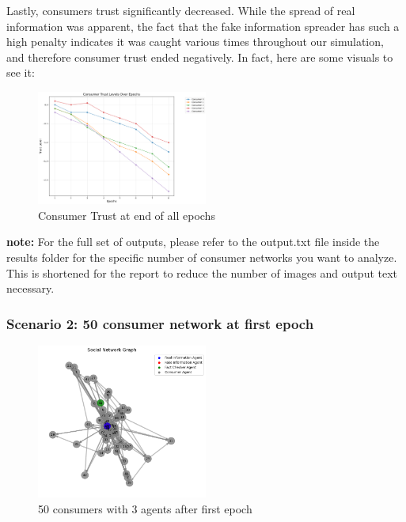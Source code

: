 \documentclass[twoside]{article}
\begin{document}
 Lastly, consumers trust significantly decreased. While the spread of real information was apparent, the fact that the fake information spreader has such a high penalty indicates it was caught various times throughout our simulation, and therefore consumer trust ended negatively. In fact,  here are some visuals to see it:

\begin{figure}[htbp]
     \centering
     \includegraphics[width=0.5\textwidth]{../results/images/consumertrust.png}
     \caption{Consumer Trust at end of all epochs}
     \label{fig: 52 consumer, 3 agents}
 \end{figure}

\textbf{note:} For the full set of outputs, please refer to the output.txt file inside the results folder for the specific number of consumer networks you want to analyze. This is shortened for the report to reduce the number of images and output text necessary.

\subsubsection{Scenario 2: 50 consumer network at first epoch}
\begin{figure}[htbp]
     \centering
     \includegraphics[width=0.5\textwidth]{../results/50consumer/50_initial.png}
     \caption{50 consumers with 3 agents after first epoch}
     \label{fig: 50 consumer, 3 agents}
 \end{figure}
\end{document}
